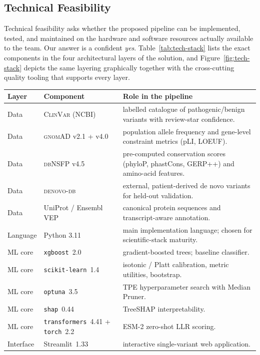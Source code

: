 \documentclass[11pt,a4paper,oneside]{report}
\begin{document}
\subsection{Technical Feasibility}
\label{sec:feas-tech}

Technical feasibility asks whether the proposed pipeline can
be implemented, tested, and maintained on the hardware and
software resources actually available to the team. Our
answer is a confident \emph{yes}. Table~\ref{tab:tech-stack}
lists the exact components in the four architectural layers
of the solution, and Figure~\ref{fig:tech-stack} depicts the
same layering graphically together with the cross-cutting
quality tooling that supports every layer.

\begin{table}[htbp]
\centering
\footnotesize
\begin{tabularx}{\linewidth}{@{}l l X@{}}
\toprule
\textbf{Layer} & \textbf{Component} & \textbf{Role in the pipeline} \\
\midrule
Data &
\textsc{ClinVar} (NCBI) &
labelled catalogue of pathogenic/benign variants with review-star confidence. \\
Data &
\textsc{gnomAD} v2.1 + v4.0 &
population allele frequency and gene-level constraint metrics (pLI, LOEUF). \\
Data &
\textsc{dbNSFP} v4.5 &
pre-computed conservation scores (phyloP, phastCons, GERP++) and amino-acid features. \\
Data &
\textsc{denovo-db} &
external, patient-derived de novo variants for held-out validation. \\
Data &
UniProt / Ensembl VEP &
canonical protein sequences and transcript-aware annotation. \\
\midrule
Language &
Python 3.11 &
main implementation language; chosen for scientific-stack maturity. \\
ML core &
\texttt{xgboost}~2.0 &
gradient-boosted trees; baseline classifier. \\
ML core &
\texttt{scikit-learn}~1.4 &
isotonic / Platt calibration, metric utilities, bootstrap. \\
ML core &
\texttt{optuna}~3.5 &
TPE hyperparameter search with Median Pruner. \\
ML core &
\texttt{shap}~0.44 &
TreeSHAP interpretability. \\
ML core &
\texttt{transformers}~4.41 + \texttt{torch}~2.2 &
ESM-2 zero-shot LLR scoring. \\
\midrule
Interface &
Streamlit~1.33 &
interactive single-variant web application. \\

\end{tabularx}
\end{table}
\end{document}

